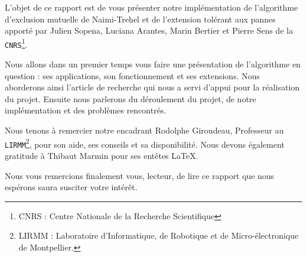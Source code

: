 L'objet de ce rapport est de vous présenter notre implémentation de l'algorithme d'exclusion mutuelle de Naimi-Trehel et de l'extension tolérant aux pannes apporté par \mbox{Julien} \mbox{Sopena}, \mbox{Luciana} \mbox{Arantes}, \mbox{Marin} \mbox{Bertier} et \mbox{Pierre} \mbox{Sens} de la \mbox{\texttt{CNRS}}\footnote{CNRS : Centre Nationale de la Recherche Scientifique}.

Nous allons dans un premier temps vous faire une présentation de l’algorithme en question : ses applications, son fonctionnement et ses extensions. Nous aborderons ainsi l’article de recherche qui nous a servi d’appui pour la réalisation du projet. Ensuite nous parlerons du déroulement du projet, de notre implémentation et des problèmes rencontrés.

Nous tenons à remercier notre encadrant \mbox{Rodolphe} \mbox{Giroudeau}, Professeur au \mbox{\texttt{LIRMM}}\footnote{LIRMM : Laboratoire d'Informatique, de Robotique et de Micro-électronique de Montpellier.}, pour son aide, ses conseils et sa disponibilité. Nous devons également gratitude à \mbox{Thibaut} \mbox{Marmin} pour ses entêtes \LaTeX{}.

Nous vous remercions finalement vous, lecteur, de lire ce rapport que nous espérons saura susciter votre intérêt.